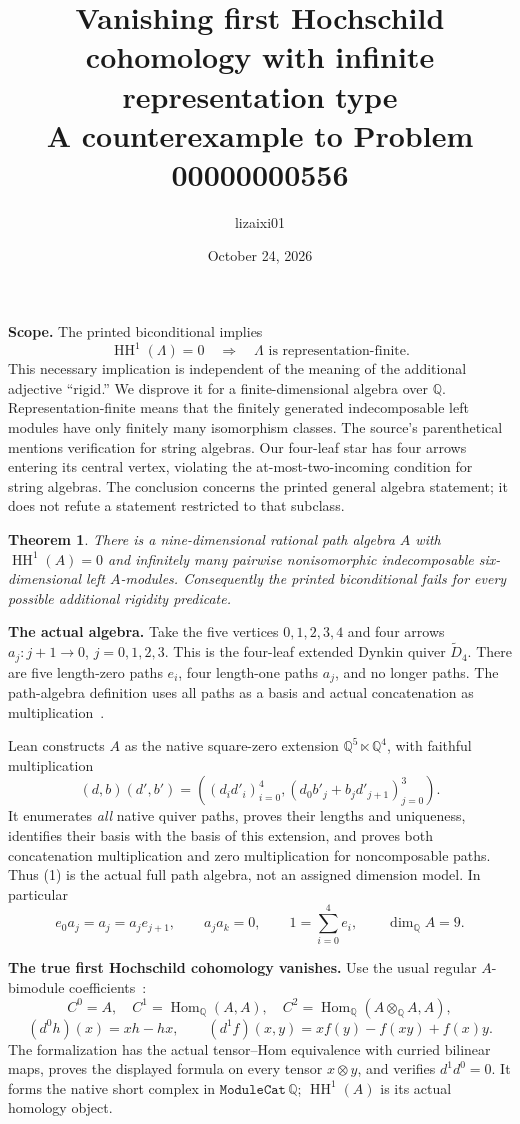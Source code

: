 \documentclass[10pt]{article}
\title{Vanishing first Hochschild cohomology with infinite representation type\\\large A counterexample to Problem 00000000556}
\author{lizaixi01}
\date{October 24, 2026}
\newcommand{\Q}{\mathbb Q}
\newcommand{\HH}{\operatorname{HH}}
\newcommand{\Hom}{\operatorname{Hom}}
\newtheorem{theorem}{Theorem}
\begin{document}
\maketitle
\vspace{-1.5em}

\textbf{Scope.} The printed biconditional implies
\[
 \HH^1(\Lambda)=0\quad\Longrightarrow\quad
 \Lambda\text{ is representation-finite}.
\]
This necessary implication is independent of the meaning of the additional
adjective ``rigid.'' We disprove it for a finite-dimensional algebra over $\Q$.
Representation-finite means that the finitely generated indecomposable left
modules have only finitely many isomorphism classes. The source's parenthetical
mentions verification for string algebras. Our four-leaf star has four arrows
entering its central vertex, violating the at-most-two-incoming condition for
string algebras. The conclusion concerns the printed general algebra statement;
it does not refute a statement restricted to that subclass.

\begin{theorem}
There is a nine-dimensional rational path algebra $A$ with $\HH^1(A)=0$ and
infinitely many pairwise nonisomorphic indecomposable six-dimensional left
$A$-modules. Consequently the printed biconditional fails for every possible
additional rigidity predicate.
\end{theorem}

\textbf{The actual algebra.}
Take the five vertices $0,1,2,3,4$ and four arrows $a_j:j+1\to0$,
$j=0,1,2,3$. This is the four-leaf extended Dynkin quiver $\widetilde D_4$.
There are five length-zero paths $e_i$, four length-one paths $a_j$, and no
longer paths. The path-algebra definition uses all paths as a basis and actual
concatenation as multiplication~\cite[p.~168]{EHIS}.

Lean constructs $A$ as the native square-zero extension
$\Q^5\ltimes\Q^4$, with faithful multiplication
\[
 (d,b)(d',b')=
 \left((d_i d'_i)_{i=0}^4,
       (d_0 b'_j+b_jd'_{j+1})_{j=0}^3\right).
 \tag{1}
\]
It enumerates \emph{all} native quiver paths, proves their lengths and uniqueness,
identifies their basis with the basis of this extension, and proves both
concatenation multiplication and zero multiplication for noncomposable paths.
Thus (1) is the actual full path algebra, not an assigned dimension model.
In particular
\[
 e_0a_j=a_j=a_je_{j+1},\qquad a_ja_k=0,\qquad 1=\sum_{i=0}^4e_i,
 \qquad\dim_{\Q}A=9.
\]

\textbf{The true first Hochschild cohomology vanishes.}
Use the usual regular $A$-bimodule coefficients~\cite[\S1.5, pp.~37--38]{Loday}:
\[
 C^0=A,\quad C^1=\Hom_{\Q}(A,A),\quad
 C^2=\Hom_{\Q}(A\otimes_{\Q}A,A),
\]
\[
 (d^0h)(x)=xh-hx,\qquad
 (d^1f)(x,y)=xf(y)-f(xy)+f(x)y.
 \tag{2}
\]
The formalization has the actual tensor--Hom equivalence with curried bilinear
maps, proves the displayed formula on every tensor $x\otimes y$, and verifies
$d^1d^0=0$. It forms the native short complex in $\texttt{ModuleCat}\,\Q$;
$\HH^1(A)$ is its actual homology object.
\end{document}
